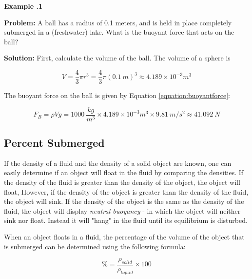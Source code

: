\begin{mdframed}[backgroundcolor=blue!10!white]
	\begin{center}
		
		
		\textbf{Example \thesection.1}	
	\end{center}
	
	\textbf{Problem: } A ball has a radius of 0.1 meters, and is held in place completely submerged in a (freshwater) lake.  What is the buoyant force that acts on the ball? 
	\vspace{0.1in}
	
	\textbf{Solution:} 
	First, calculate the volume of the ball.  The volume of a sphere is
	
		\begin{equation*}
		V = \frac{4}{3}\pi r^3 = \frac{4}{3}\pi (\SI{0.1}{m})^3 \approx 4.189 \times 10^{-3}\si{m^3}
	\end{equation*}
	
	
	
	The buoyant force on the ball is given by Equation \ref{equation:buoyantforce}:
	
	
	\begin{equation*}
		F_B = \rho V g = \SI{1000}{\frac{kg}{m^3}} \times 4.189 \times 10^{-3}\si{m^3} \times \SI{9.81}{m/s^2} \approx \SI{41.092}{N}
	\end{equation*}
	
\end{mdframed}
\vspace{0.1in}




	\subsection{Percent Submerged}
	If the density of a fluid and the density of a solid object are known, one can easily determine if an object will float in the fluid by comparing the densities.  If the density of the fluid is greater than the density of the object, the object will float,  However, if the density of the object is greater than the density of the fluid, the object will sink.  If the density of the object is the same as the density of the fluid, the object will display \textit{neutral buoyancy} - in which the object will neither sink nor float.  Instead it will "hang" in the fluid until its equilibrium is disturbed.  
	
	When an object floats in a fluid, the percentage of the volume of the object that is submerged can be determined using the following formula: 
				\begin{mdframed}[backgroundcolor=orange!20!white]
		\begin{equation}
			\% = \frac{\rho_{solid}}{\rho_{liquid}} \times 100
			\label{equation:percentsubmerged}
		\end{equation}
	\end{mdframed}
	
